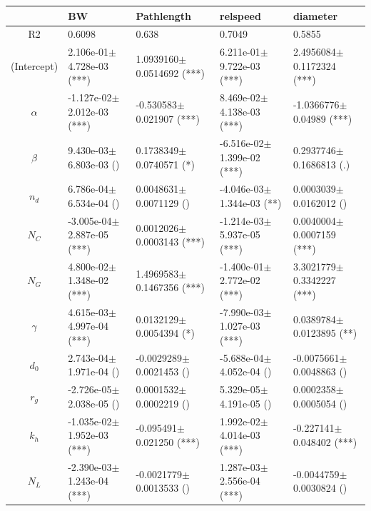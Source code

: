 \begin{center}


\begin{tabular}{|c|p{3.7cm}|p{3.7cm}|p{3.7cm}|p{3.7cm}|}
 \hline
&BW&Pathlength&relspeed&diameter\\\hline
R2&0.6098&0.638 &0.7049 &0.5855\\\hline
(Intercept)&2.106e-01$\pm$ 4.728e-03 (***)&1.0939160$\pm$ 0.0514692 (***)&6.211e-01$\pm$ 9.722e-03 (***)&2.4956084$\pm$ 0.1172324 (***)\\
$\alpha$&-1.127e-02$\pm$ 2.012e-03 (***)&-0.530583$\pm$ 0.021907 (***)&8.469e-02$\pm$ 4.138e-03 (***)&-1.0366776$\pm$ 0.04989 (***)\\
$\beta$&9.430e-03$\pm$ 6.803e-03 ()&0.1738349$\pm$ 0.0740571 (*)&-6.516e-02$\pm$ 1.399e-02 (***)&0.2937746$\pm$ 0.1686813 (.)\\
$n_d$&6.786e-04$\pm$ 6.534e-04 ()&0.0048631$\pm$ 0.0071129 ()&-4.046e-03$\pm$ 1.344e-03 (**)&0.0003039$\pm$ 0.0162012 ()\\
$N_C$&-3.005e-04$\pm$ 2.887e-05 (***)&0.0012026$\pm$ 0.0003143 (***)&-1.214e-03$\pm$ 5.937e-05 (***)&0.0040004$\pm$ 0.0007159 (***)\\
$N_G$&4.800e-02$\pm$ 1.348e-02 (***)&1.4969583$\pm$ 0.1467356 (***)&-1.400e-01$\pm$ 2.772e-02 (***)&3.3021779$\pm$ 0.3342227 (***)\\
$\gamma$&4.615e-03$\pm$ 4.997e-04 (***)&0.0132129$\pm$ 0.0054394 (*)&-7.990e-03$\pm$ 1.027e-03 (***)&0.0389784$\pm$ 0.0123895 (**)\\
$d_0$&2.743e-04$\pm$ 1.971e-04 ()&-0.0029289$\pm$ 0.0021453 ()&-5.688e-04$\pm$ 4.052e-04 ()&-0.0075661$\pm$ 0.0048863 ()\\
$r_g$&-2.726e-05$\pm$ 2.038e-05 ()&0.0001532$\pm$ 0.0002219 ()&5.329e-05$\pm$ 4.191e-05 ()&0.0002358$\pm$ 0.0005054 ()\\
$k_h$&-1.035e-02$\pm$ 1.952e-03 (***)&-0.095491$\pm$ 0.021250 (***)&1.992e-02$\pm$ 4.014e-03 (***)&-0.227141$\pm$ 0.048402 (***)\\
$N_L$&-2.390e-03$\pm$ 1.243e-04 (***)&-0.0021779$\pm$ 0.0013533 ()&1.287e-03$\pm$ 2.556e-04 (***)&-0.0044759$\pm$ 0.0030824 ()\\

 \hline
\end{tabular}

\bigskip

\hspace{-0.4cm}


\end{center}
